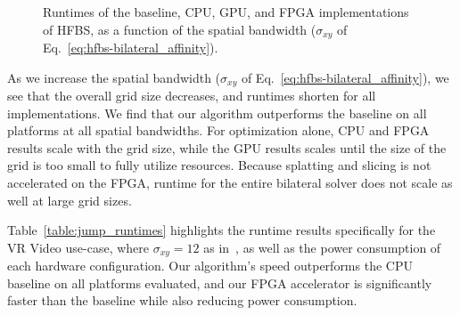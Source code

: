 \begin{figure}[!ht]
  \hfill
  \caption{Runtimes of the baseline, CPU, GPU, and FPGA implementations of HFBS, as a function of the spatial bandwidth ($\sigma_{xy}$ of Eq.~\ref{eq:hfbs-bilateral_affinity}).}
  \label{fig:latency-all}
\end{figure}

As we increase the spatial bandwidth ($\sigma_{xy}$ of Eq.~\ref{eq:hfbs-bilateral_affinity}), we see that the overall grid size decreases, and runtimes shorten for all implementations.
We find that our algorithm outperforms the baseline on all platforms at all spatial bandwidths.
For optimization alone, CPU and FPGA results scale with the grid size, while the GPU results scales until the size of the grid is too small to fully utilize resources.
Because splatting and slicing is not accelerated on the FPGA, runtime for the entire bilateral solver does not scale as well at large grid sizes.

Table~\ref{table:jump_runtimes} highlights the runtime results specifically for the VR Video use-case, where $\sigma_{xy} = 12$ as in~\cite{googlejump}, as well as the power consumption of each hardware configuration. Our algorithm's speed outperforms the CPU baseline on all platforms evaluated, and our FPGA accelerator is significantly faster than the baseline while also reducing power consumption.


